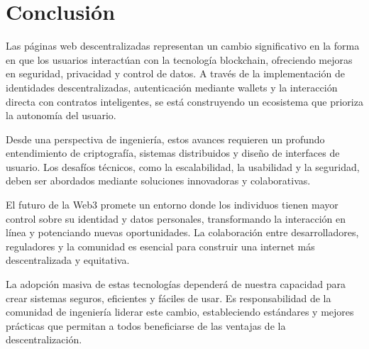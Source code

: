 \section{Conclusión}

Las páginas web descentralizadas representan un cambio significativo en la forma en que los usuarios interactúan con la tecnología blockchain, ofreciendo mejoras en seguridad, privacidad y control de datos. A través de la implementación de identidades descentralizadas, autenticación mediante wallets y la interacción directa con contratos inteligentes, se está construyendo un ecosistema que prioriza la autonomía del usuario.

Desde una perspectiva de ingeniería, estos avances requieren un profundo entendimiento de criptografía, sistemas distribuidos y diseño de interfaces de usuario. Los desafíos técnicos, como la escalabilidad, la usabilidad y la seguridad, deben ser abordados mediante soluciones innovadoras y colaborativas.

El futuro de la Web3 promete un entorno donde los individuos tienen mayor control sobre su identidad y datos personales, transformando la interacción en línea y potenciando nuevas oportunidades. La colaboración entre desarrolladores, reguladores y la comunidad es esencial para construir una internet más descentralizada y equitativa.

La adopción masiva de estas tecnologías dependerá de nuestra capacidad para crear sistemas seguros, eficientes y fáciles de usar. Es responsabilidad de la comunidad de ingeniería liderar este cambio, estableciendo estándares y mejores prácticas que permitan a todos beneficiarse de las ventajas de la descentralización.

